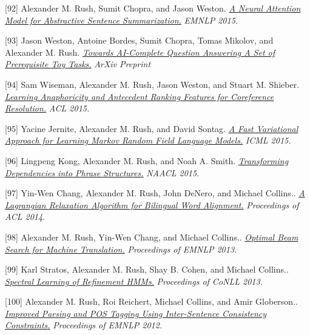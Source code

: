 \documentclass[10pt]{article}
\begin{document}
[92] \ind Alexander M. Rush, Sumit Chopra, and Jason Weston. \emph{\href{ http://arxiv.org/pdf/1509.00685.pdf }{ A Neural Attention Model for Abstractive Sentence Summarization.} }\emph{ EMNLP 2015. }

\medskip


[93] \ind Jason Weston, Antoine Bordes, Sumit Chopra, Tomas Mikolov, and Alexander M. Rush. \emph{\href{ http://arxiv.org/pdf/1502.05698.pdf }{ Towards AI-Complete Question Answering A Set of Prerequisite Toy Tasks.} }\emph{ ArXiv Preprint }

\medskip


[94] \ind Sam Wiseman, Alexander M. Rush, Jason Weston, and Stuart M. Shieber. \emph{\href{ http://people.seas.harvard.edu/~srush/acl15.pdf }{ Learning Anaphoricity and Antecedent Ranking Features for Coreference Resolution.} }\emph{ ACL 2015. }

\medskip


[95] \ind Yacine Jernite, Alexander M. Rush, and David Sontag. \emph{\href{ http://people.seas.harvard.edu/~srush/icml15.pdf }{ A Fast Variational Approach for Learning Markov Random Field Language Models.} }\emph{ ICML 2015. }

\medskip


[96] \ind Lingpeng Kong, Alexander M. Rush, and Noah A. Smith. \emph{\href{ http://people.seas.harvard.edu/~srush/naacl15.pdf }{ Transforming Dependencies into Phrase Structures.} }\emph{ NAACL 2015. }

\medskip




[97] \ind Yin-Wen Chang, Alexander M. Rush, John DeNero, and Michael Collins.. \emph{\href{ http://people.csail.mit.edu/srush/ }{ A Lagrangian Relaxation Algorithm for Bilingual Word Alignment.} }\emph{ Proceedings of ACL 2014. }

[98] \ind Alexander M. Rush, Yin-Wen Chang, and Michael Collins.. \emph{\href{ None }{ Optimal Beam Search for Machine Translation.} }\emph{ Proceedings of EMNLP 2013. }

[99] \ind Karl Stratos, Alexander M. Rush, Shay B. Cohen, and Michael Collins.. \emph{\href{ http://www.cs.columbia.edu/~stratos/research/conll13rhmm.pdf }{ Spectral Learning of Refinement HMMs.} }\emph{ Proceedings of CoNLL 2013. }

[100] \ind Alexander M. Rush, Roi Reichert, Michael Collins, and Amir Globerson.. \emph{\href{ http://people.csail.mit.edu/srush/emnlp2012.pdf.pdf }{ Improved Parsing and POS Tagging Using Inter-Sentence Consistency Constraints.} }\emph{ Proceedings of EMNLP 2012. }
\end{document}
